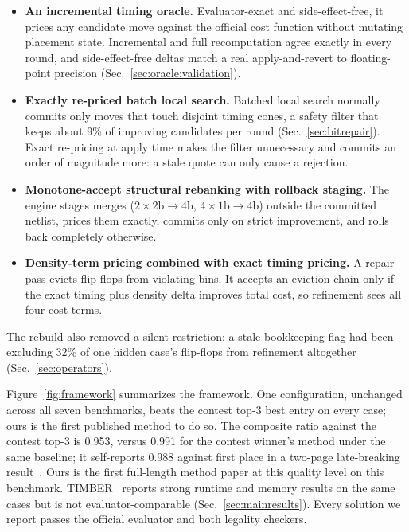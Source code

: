 \begin{itemize}
\item \textbf{An incremental timing oracle.} Evaluator-exact and side-effect-free, it prices any candidate move against the official cost function without mutating placement state. Incremental and full recomputation agree exactly in every round, and side-effect-free deltas match a real apply-and-revert to floating-point precision (Sec.~\ref{sec:oracle:validation}).
\item \textbf{Exactly re-priced batch local search.} Batched local search normally commits only moves that touch disjoint timing cones, a safety filter that keeps about 9\% of improving candidates per round (Sec.~\ref{sec:bitrepair}). Exact re-pricing at apply time makes the filter unnecessary and commits an order of magnitude more: a stale quote can only cause a rejection.
\item \textbf{Monotone-accept structural rebanking with rollback staging.} The engine stages merges ($2{\times}2\mathrm{b}{\to}4\mathrm{b}$, $4{\times}1\mathrm{b}{\to}4\mathrm{b}$) outside the committed netlist, prices them exactly, commits only on strict improvement, and rolls back completely otherwise.
\item \textbf{Density-term pricing combined with exact timing pricing.} A repair pass evicts flip-flops from violating bins. It accepts an eviction chain only if the exact timing plus density delta improves total cost, so refinement sees all four cost terms.
\end{itemize}

The rebuild also removed a silent restriction: a stale bookkeeping flag had been excluding 32\% of one hidden case's flip-flops from refinement altogether (Sec.~\ref{sec:operators}).

Figure~\ref{fig:framework} summarizes the framework. One configuration, unchanged across all seven benchmarks, beats the contest top-3 best entry on every case; ours is the first published method to do so. The composite ratio against the contest top-3 is 0.953, versus 0.991 for the contest winner's method under the same baseline; it self-reports 0.988 against first place in a two-page late-breaking result~\cite{li2025lbr}. Ours is the first full-length method paper at this quality level on this benchmark. TIMBER~\cite{dassarma2026timber} reports strong runtime and memory results on the same cases but is not evaluator-comparable (Sec.~\ref{sec:mainresults}). Every solution we report passes the official evaluator and both legality checkers.
